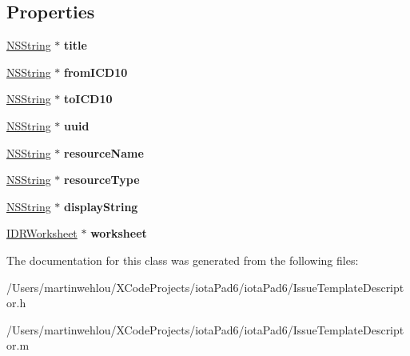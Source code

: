 \subsection*{Properties}
\begin{DoxyCompactItemize}
\item 
\hypertarget{interface_issue_template_descriptor_ac3781a026998351cf5330a4f8949aad1}{
\hyperlink{class_n_s_string}{NSString} $\ast$ {\bfseries title}}
\label{interface_issue_template_descriptor_ac3781a026998351cf5330a4f8949aad1}

\item 
\hypertarget{interface_issue_template_descriptor_a2c481f47827afea2a35e98a791d5f0ae}{
\hyperlink{class_n_s_string}{NSString} $\ast$ {\bfseries fromICD10}}
\label{interface_issue_template_descriptor_a2c481f47827afea2a35e98a791d5f0ae}

\item 
\hypertarget{interface_issue_template_descriptor_a958471b17235ca6b25aa58f0511bb623}{
\hyperlink{class_n_s_string}{NSString} $\ast$ {\bfseries toICD10}}
\label{interface_issue_template_descriptor_a958471b17235ca6b25aa58f0511bb623}

\item 
\hypertarget{interface_issue_template_descriptor_ac826c795b6db5934832b08ca3952202a}{
\hyperlink{class_n_s_string}{NSString} $\ast$ {\bfseries uuid}}
\label{interface_issue_template_descriptor_ac826c795b6db5934832b08ca3952202a}

\item 
\hypertarget{interface_issue_template_descriptor_a4c4a8689b8775923d88e2a197467fe90}{
\hyperlink{class_n_s_string}{NSString} $\ast$ {\bfseries resourceName}}
\label{interface_issue_template_descriptor_a4c4a8689b8775923d88e2a197467fe90}

\item 
\hypertarget{interface_issue_template_descriptor_ad90c42cb273b925c8ab98d451a7a9b3d}{
\hyperlink{class_n_s_string}{NSString} $\ast$ {\bfseries resourceType}}
\label{interface_issue_template_descriptor_ad90c42cb273b925c8ab98d451a7a9b3d}

\item 
\hypertarget{interface_issue_template_descriptor_a3be96fbce69ab78f35b2802037169132}{
\hyperlink{class_n_s_string}{NSString} $\ast$ {\bfseries displayString}}
\label{interface_issue_template_descriptor_a3be96fbce69ab78f35b2802037169132}

\item 
\hypertarget{interface_issue_template_descriptor_a2492dbb7ba1cfc9387f9df034e8c4ad5}{
\hyperlink{interface_i_d_r_worksheet}{IDRWorksheet} $\ast$ {\bfseries worksheet}}
\label{interface_issue_template_descriptor_a2492dbb7ba1cfc9387f9df034e8c4ad5}

\end{DoxyCompactItemize}


The documentation for this class was generated from the following files:\begin{DoxyCompactItemize}
\item 
/Users/martinwehlou/XCodeProjects/iotaPad6/iotaPad6/IssueTemplateDescriptor.h\item 
/Users/martinwehlou/XCodeProjects/iotaPad6/iotaPad6/IssueTemplateDescriptor.m\end{DoxyCompactItemize}
